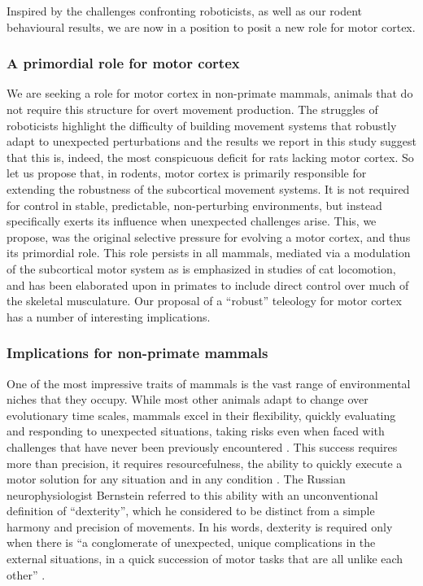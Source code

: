 Inspired by the challenges confronting roboticists, as well as our rodent behavioural results, we are now in a position to posit a new role for motor cortex.

\subsubsection*{A primordial role for motor cortex}

We are seeking a role for motor cortex in non-primate mammals, animals that do not require this structure for overt movement production. The struggles of roboticists highlight the difficulty of building movement systems that robustly adapt to unexpected perturbations and the results we report in this study suggest that this is, indeed, the most conspicuous deficit for rats lacking motor cortex. So let us propose that, in rodents, motor cortex is primarily responsible for extending the robustness of the subcortical movement systems. It is not required for control in stable, predictable, non-perturbing environments, but instead specifically exerts its influence when unexpected challenges arise. This, we propose, was the original selective pressure for evolving a motor cortex, and thus its primordial role. This role persists in all mammals, mediated via a modulation of the subcortical motor system as is emphasized in studies of cat locomotion, and has been elaborated upon in primates to include direct control over much of the skeletal musculature. Our proposal of a ``robust'' teleology for motor cortex has a number of interesting implications.

\subsubsection*{Implications for non-primate mammals}

One of the most impressive traits of mammals is the vast range of environmental niches that they occupy. While most other animals adapt to change over evolutionary time scales, mammals excel in their flexibility, quickly evaluating and responding to unexpected situations, taking risks even when faced with challenges that have never been previously encountered \cite{Spinka2001}. This success requires more than precision, it requires resourcefulness, the ability to quickly execute a motor solution for any situation and in any condition \cite{Bernstein1996}. The Russian neurophysiologist Bernstein referred to this ability with an unconventional definition of ``dexterity'', which he considered to be distinct from a simple harmony and precision of movements. In his words, dexterity is required only when there is \enquote{a conglomerate of unexpected, unique complications in the external situations, in a quick succession of motor tasks that are all unlike each other} \cite{Bernstein1996}.


